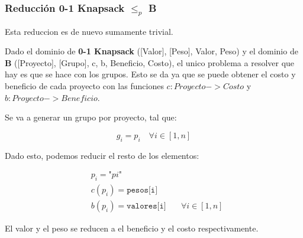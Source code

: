 \subsubsection*{Reducci\'on 0-1 Knapsack $\le_{p}$ B }

Esta reduccion es de nuevo sumamente trivial. 

Dado el dominio de \textbf{0-1 Knapsack} ([Valor], [Peso], Valor, Peso) y 
el dominio de \textbf{B} ([Proyecto], [Grupo], c, b, Beneficio, Costo), el unico 
problema a resolver que hay es que se hace con los grupos. Esto se da ya que 
se puede obtener el costo y beneficio de cada proyecto con las funciones 
$c: Proyecto -> Costo$ y 
$b: Proyecto -> Beneficio$.

Se va a generar un grupo por proyecto, tal que: 

\[
  g_i = {p_i} \quad \forall i \in [1, n]
\]

Dado esto, podemos reducir el resto de los elementos: 

\begin{align*}
  &p_i = \texttt{"$pi$"} &\\
  &c(p_i) = \texttt{pesos[i]} &\\
  &b(p_i) = \texttt{valores[i]} &\quad \forall i \in [1, n] 
\end{align*}

El valor y el peso se reducen a el beneficio y el costo respectivamente.

